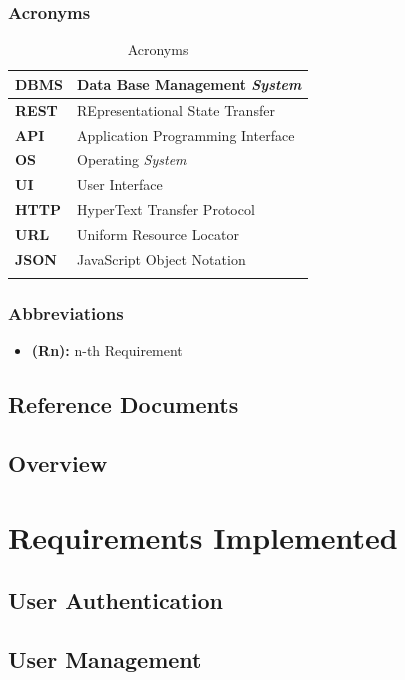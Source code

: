 \documentclass[titlepage]{article}
\begin{document}
\subsubsection{Acronyms}
\begin{longtable}{| p{2 cm} | p{7 cm} |} \hline
		{\bf DBMS} & Data Base Management {\it System} \\ \hline
		{\bf REST} & REpresentational State Transfer \\ \hline
		{\bf API} & Application Programming Interface \\ \hline
		{\bf OS} & Operating {\it System}\\ \hline
		{\bf UI} & User Interface \\ \hline
		{\bf HTTP} & HyperText Transfer Protocol \\ \hline	
		{\bf URL} & Uniform Resource Locator \\ \hline
		{\bf JSON} & JavaScript Object Notation \\ \hline
		\caption{Acronyms}	
						
	\end{longtable}
\subsubsection{Abbreviations}

\begin{itemize}
	\item {\bf (Rn):} n-th Requirement
\end{itemize}

\subsection{Reference Documents}
\subsection{Overview}

\pagebreak
\section{Requirements Implemented}

\subsection{User Authentication}
\subsection{User Management}
\end{document}
